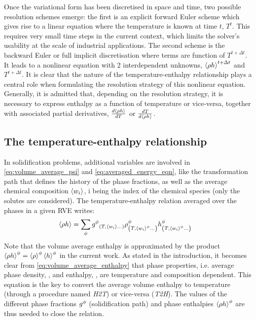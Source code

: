 Once the variational form has been discretised in space and time, two possible resolution schemes emerge: the first is an 
explicit forward Euler scheme which gives rise to a linear equation where the temperature is known at time $t$, $T^t$. This requires very small 
time steps in the current context, which limits the solver's usability at the scale of industrial applications. The second scheme is the 
backward Euler or full implicit discretisation where terms are function of $T^{t+\Delta t}$. It leads to a nonlinear equation with 2 interdependent 
unknowns, $\left \langle  \rho h  \right \rangle^{t+\Delta t}$ and  $T^{t+\Delta t}$. It is clear that the nature of the temperature-enthalpy relationship plays a central 
role when formulating the resolution strategy of this nonlinear equation. Generally, it is admitted that, depending on the resolution strategy, 
it is necessary to express enthalpy as a function of temperature or vice-versa, together with associated partial derivatives, 
$\frac{d \left \langle  \rho h  \right \rangle}{dT}$ or $\frac{dT }{d \left \langle  \rho h  \right \rangle}$.

\subsection{The temperature-enthalpy relationship} 
In solidification problems, additional variables are involved in \cref{eq:volume_average_psi} and \cref{eq:averaged_energy_eqn}, 
like the transformation path that defines the history of the phase fractions, as well as the average chemical composition $\left \langle w_i \right \rangle$, 
i being the index of the chemical species (only the solutes are considered). The temperature-enthalpy relation averaged over the 
phases in a given RVE writes:
\begin{align}
\label{eq:volume_average_enthalpy}
& \rh = \sum_\phi \gphi_{\brac{T, \wi \dots}} \rphi_{\brac{T, \wi^{\phi} \dots}} \hphi_{\brac{T, \wi^{\phi} \dots}}
\end{align}
Note that the volume average enthalpy is approximated by the product $\left \langle \rho h \right \rangle^{\phi}=\left \langle \rho \right \rangle^{\phi}\left \langle h \right \rangle^{\phi}$ in the current work. As stated 
in the introduction, it becomes clear from \cref{eq:volume_average_enthalpy} that phase properties, i.e. average phase density, , \rphi and enthalpy, \hphi, 
are temperature and composition dependent. This equation is the key to convert the average volume enthalpy to temperature (through a procedure named \emph{H2T}) 
or vice-versa (\emph{T2H}). The values of the different phase fractions ${g^{\phi}} $ (solidification path) and phase enthalpies $\left \langle  \rho h  \right \rangle^{\phi}$ are thus needed 
to close the relation.

